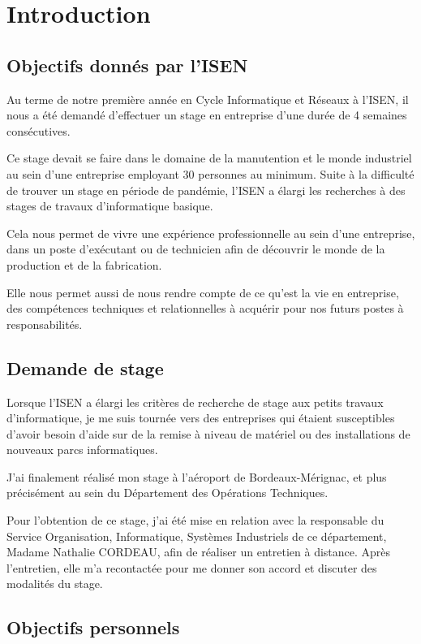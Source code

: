 \chapter{Introduction}

\section{Objectifs donnés par l'ISEN}


Au terme de notre première année en Cycle Informatique et Réseaux à l’ISEN, il nous a été demandé d’effectuer un stage en entreprise d’une durée de 4 semaines consécutives.


Ce stage devait se faire dans le domaine de la manutention et le monde industriel au sein d’une entreprise employant 30 personnes au minimum. Suite à la difficulté de trouver un stage en période de pandémie, l’ISEN a élargi les recherches à des stages de travaux d’informatique basique.


Cela nous permet de vivre une expérience professionnelle au sein d’une entreprise, dans un poste d’exécutant ou de technicien afin de découvrir le monde de la production et de la fabrication.


Elle nous permet aussi de nous rendre compte de ce qu'est la vie en entreprise, des compétences techniques et relationnelles à acquérir pour nos futurs postes à responsabilités.


\section{Demande de stage}

Lorsque l’ISEN a élargi les critères de recherche de stage aux petits travaux d’informatique, je me suis tournée vers des entreprises qui étaient susceptibles d'avoir besoin d’aide sur de la remise à niveau de matériel ou des installations de nouveaux parcs informatiques.


J’ai finalement réalisé mon stage à l’aéroport de Bordeaux-Mérignac, et plus précisément au sein du Département des Opérations Techniques.


Pour l’obtention de ce stage, j’ai été mise en relation avec la responsable du Service Organisation, Informatique, Systèmes Industriels de ce département, Madame Nathalie CORDEAU, afin de réaliser un entretien à distance. Après l’entretien, elle m'a recontactée pour me donner son accord et discuter des modalités du stage.


\section{Objectifs personnels}

